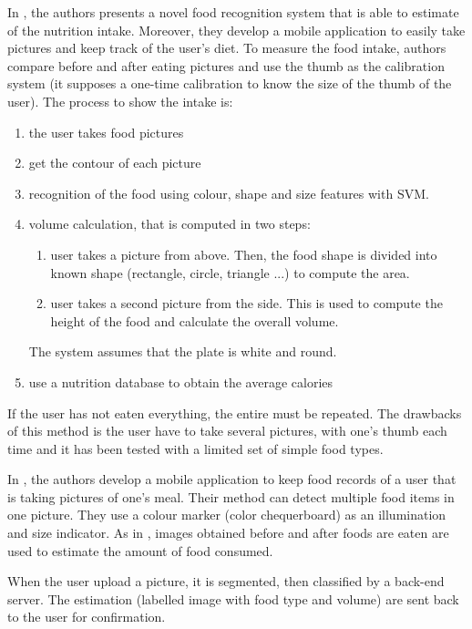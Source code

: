 In \cite{Almaghrabi2012a}, the authors presents a novel food recognition system that is able to estimate of the nutrition intake. Moreover, they develop a mobile application to easily take pictures and keep track of the user's diet.
To measure the food intake, authors compare before and after eating pictures and use the thumb as the calibration system (it supposes a one-time calibration to know the size of the thumb of the user).
The process to show the intake is:
\begin{enumerate}
    \item the user takes food pictures
    \item get the contour of each picture
    \item recognition of the food using colour, shape and size features with SVM.
    \item volume calculation, that is computed in two steps:
    \begin{enumerate}
        \item user takes a picture from above. Then, the food shape is divided into known shape (rectangle, circle, triangle ...) to compute the area.
        \item user takes a second picture from the side. This is used to compute the height of the food and calculate the overall volume.
    \end{enumerate}
    The system assumes that the plate is white and round.
    \item use a nutrition database to obtain the average calories
\end{enumerate}
If the user has not eaten everything, the entire must be repeated.
The drawbacks of this method is the user have to take several pictures, with one's thumb each time and it has been tested with a limited set of simple food types.

%
%

In \cite{Zhu2010}, the authors develop a mobile application to keep food records of a user that is taking pictures of one's meal. Their method can detect multiple food items in one picture. They use a colour marker (color chequerboard) as an illumination and size indicator.
As in \cite{Almaghrabi2012a}, images obtained before and after foods are eaten are used to estimate the amount of food consumed.

When the user upload a picture, it is segmented, then classified by a back-end server. The estimation (labelled image with food type and volume) are sent back to the user for confirmation.

